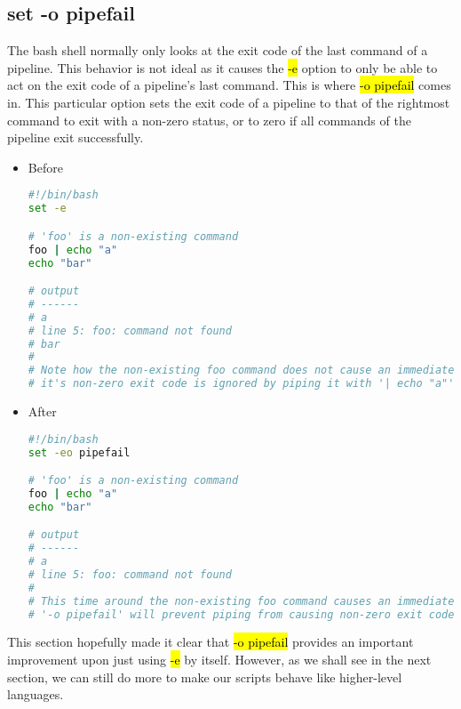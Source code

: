 \documentclass[a4paper]{article}
\begin{document}
\subsection{set -o pipefail}
The bash shell normally only looks at the exit code of the last command of a pipeline. 
This behavior is not ideal as it causes the \hl{-e} option to only be able to act on the exit code of a pipeline’s last command. This is where \hl{-o pipefail} comes in. This particular option sets the exit code of a pipeline to that of the rightmost command to exit with a non-zero status, or to zero if all commands of the pipeline exit successfully.
\begin{itemize}
  \item Before
  \begin{lstlisting}[language=Bash]
#!/bin/bash
set -e

# 'foo' is a non-existing command
foo | echo "a"
echo "bar"

# output
# ------
# a
# line 5: foo: command not found
# bar
#
# Note how the non-existing foo command does not cause an immediate exit, as
# it's non-zero exit code is ignored by piping it with '| echo "a"'.
  \end{lstlisting}
  \item After
  \begin{lstlisting}[language=Bash]
#!/bin/bash
set -eo pipefail

# 'foo' is a non-existing command
foo | echo "a"
echo "bar"

# output
# ------
# a
# line 5: foo: command not found
#
# This time around the non-existing foo command causes an immediate exit, as
# '-o pipefail' will prevent piping from causing non-zero exit codes to be ignored.
  \end{lstlisting}
\end{itemize}
This section hopefully made it clear that \hl{-o pipefail} provides an important improvement upon just using \hl{-e} by itself.
However, as we shall see in the next section, we can still do more to make our scripts behave like higher-level languages.
\end{document}
